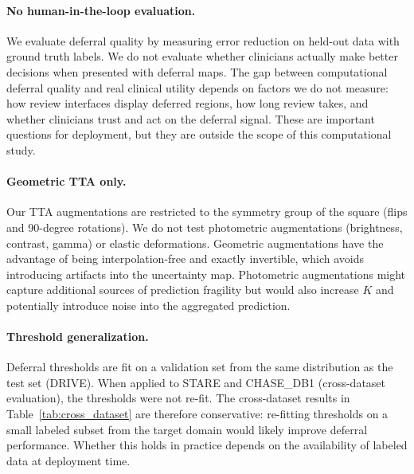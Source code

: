 \paragraph{No human-in-the-loop evaluation.} We evaluate deferral quality
by measuring error reduction on held-out data with ground truth labels.
We do not evaluate whether clinicians actually make better decisions when
presented with deferral maps. The gap between computational deferral
quality and real clinical utility depends on factors we do not measure:
how review interfaces display deferred regions, how long review takes,
and whether clinicians trust and act on the deferral signal. These are
important questions for deployment, but they are outside the scope of
this computational study.

\paragraph{Geometric TTA only.} Our TTA augmentations are restricted to
the symmetry group of the square (flips and 90-degree rotations). We do
not test photometric augmentations (brightness, contrast, gamma) or elastic
deformations. Geometric augmentations have the advantage of being
interpolation-free and exactly invertible, which avoids introducing
artifacts into the uncertainty map. Photometric augmentations might capture
additional sources of prediction fragility but would also increase $K$ and
potentially introduce noise into the aggregated prediction.

\paragraph{Threshold generalization.} Deferral thresholds are fit on a
validation set from the same distribution as the test set (DRIVE). When
applied to STARE and CHASE\_DB1 (cross-dataset evaluation), the thresholds
were not re-fit. The cross-dataset results in Table~\ref{tab:cross_dataset}
are therefore conservative: re-fitting thresholds on a small labeled
subset from the target domain would likely improve deferral performance.
Whether this holds in practice depends on the availability of labeled
data at deployment time.
